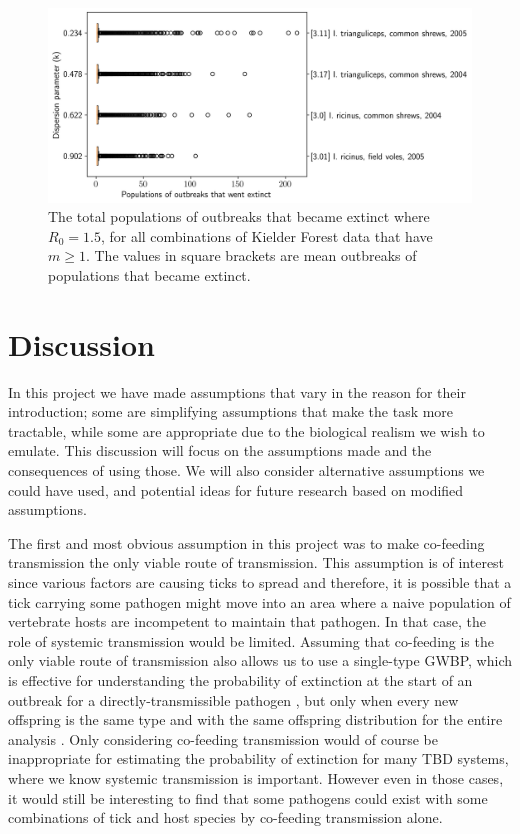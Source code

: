 \documentclass{article}
\begin{document}
\begin{figure}[]
	\begin{mdframed}[backgroundcolor=grey250,rightline=false,leftline=false,topline=false]
		\centering
		\includegraphics[width=.73\linewidth,valign=m]{allCombinations_populationsOfOutbreaksThatWentExtinct}
		\caption{The total populations of outbreaks that became extinct where $ R_0 = 1.5 $, for all combinations of Kielder Forest data that have $ m \ge 1 $. The values in square brackets are mean outbreaks of populations that became extinct.}
		\label{fig:allCombinations_populationsOfOutbreaksThatWentExtinct}
	\end{mdframed}
\end{figure}

\clearpage
\newpage

\section{Discussion}

In this project we have made assumptions that vary in the reason for their introduction; some are simplifying assumptions that make the task more tractable, while some are appropriate due to the biological realism we wish to emulate. This discussion will focus on the assumptions made and the consequences of using those. We will also consider alternative assumptions we could have used, and potential ideas for future research based on modified assumptions.

The first and most obvious assumption in this project was to make co-feeding transmission the only viable route of transmission. This assumption is of interest since various factors are causing ticks to spread \cite{Medlock2013, Alkishe_2017, Cunze_2022} and therefore, it is possible that a tick carrying some pathogen might move into an area where a naive population of vertebrate hosts are incompetent to maintain that pathogen. In that case, the role of systemic transmission would be limited. Assuming that co-feeding is the only viable route of transmission also allows us to use a single-type GWBP, which is effective for understanding the probability of extinction at the start of an outbreak for a directly-transmissible pathogen \cite{LloydSmith2005}, but only when every new offspring is the same type and with the same offspring distribution for the entire analysis \cite{Allen2019}. Only considering co-feeding transmission would of course be inappropriate for estimating the probability of extinction for many TBD systems, where we know systemic transmission is important. However even in those cases, it would still be interesting to find that some pathogens could exist with some combinations of tick and host species by co-feeding transmission alone.
\end{document}
